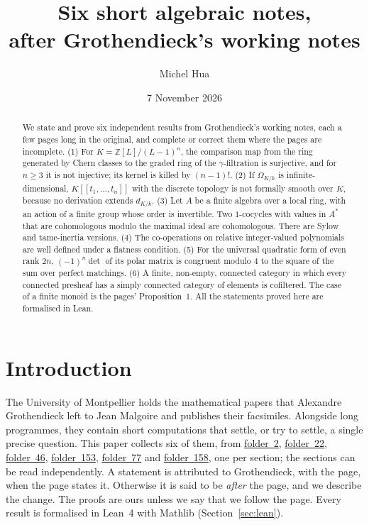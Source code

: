 \documentclass[11pt,a4paper]{amsart}
\title[Six short algebraic notes]{Six short algebraic notes,\\ after Grothendieck's working notes}
\author{Michel Hua}
\date{7 November 2026}
\theoremstyle{definition}
\theoremstyle{remark}
\newcommand{\Z}{\mathbb Z}
\newcommand{\fac}[1]{\href{https://grothendieck.umontpellier.fr/#1.pdf}{folder~#1}}
\begin{document}
\begin{abstract}
We state and prove six independent results from Grothendieck's working notes, each a few pages long in the original, and complete or correct them where the pages are incomplete.
(1) For $K = \Z[L]/(L-1)^n$, the comparison map from the ring generated by Chern classes to the graded ring of the $\gamma$-filtration is surjective, and for $n \ge 3$ it is not injective; its kernel is killed by $(n-1)!$.
(2) If $\Omega_{K/k}$ is infinite-dimensional, $K[[t_1, \dots, t_n]]$ with the discrete topology is not formally smooth over $K$, because no derivation extends $d_{K/k}$.
(3) Let $A$ be a finite algebra over a local ring, with an action of a finite group whose order is invertible. Two $1$-cocycles with values in $A^*$ that are cohomologous modulo the maximal ideal are cohomologous. There are Sylow and tame-inertia versions.
(4) The co-operations on relative integer-valued polynomials are well defined under a flatness condition.
(5) For the universal quadratic form of even rank $2n$, $(-1)^n\det$ of its polar matrix is congruent modulo $4$ to the square of the sum over perfect matchings.
(6) A finite, non-empty, connected category in which every connected presheaf has a simply connected category of elements is cofiltered. The case of a finite monoid is the pages' Proposition~1.
All the statements proved here are formalised in Lean.
\end{abstract}

\maketitle

\section*{Introduction}

The University of Montpellier holds the mathematical papers that Alexandre Grothendieck left to Jean Malgoire and publishes their facsimiles. Alongside long programmes, they contain short computations that settle, or try to settle, a single precise question. This paper collects six of them, from \fac{2}, \fac{22}, \fac{46}, \fac{153}, \fac{77} and \fac{158}, one per section; the sections can be read independently. A statement is attributed to Grothendieck, with the page, when the page states it. Otherwise it is said to be \emph{after} the page, and we describe the change. The proofs are ours unless we say that we follow the page. Every result is formalised in Lean~4 with Mathlib (Section~\ref{sec:lean}).
\end{document}
